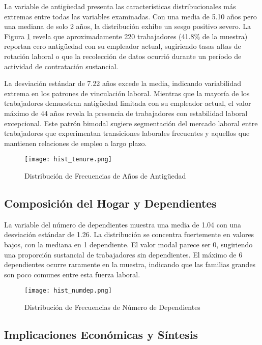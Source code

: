 \documentclass[12pt]{article}
\begin{document}
La variable de antigüedad presenta las características distribucionales más extremas entre todas las variables examinadas. Con una media de 5.10 años pero una mediana de solo 2 años, la distribución exhibe un sesgo positivo severo. La Figura \ref{fig:hist_tenure} revela que aproximadamente 220 trabajadores (41.8\% de la muestra) reportan cero antigüedad con su empleador actual, sugiriendo tasas altas de rotación laboral o que la recolección de datos ocurrió durante un período de actividad de contratación sustancial.

La desviación estándar de 7.22 años excede la media, indicando variabilidad extrema en los patrones de vinculación laboral. Mientras que la mayoría de los trabajadores demuestran antigüedad limitada con su empleador actual, el valor máximo de 44 años revela la presencia de trabajadores con estabilidad laboral excepcional. Este patrón bimodal sugiere segmentación del mercado laboral entre trabajadores que experimentan transiciones laborales frecuentes y aquellos que mantienen relaciones de empleo a largo plazo.

\begin{figure}[H]
\centering
\texttt{[image: hist\_tenure.png]}
\caption{Distribución de Frecuencias de Años de Antigüedad}
\label{fig:hist_tenure}
\end{figure}

\subsection{Composición del Hogar y Dependientes}

La variable del número de dependientes muestra una media de 1.04 con una desviación estándar de 1.26. La distribución se concentra fuertemente en valores bajos, con la mediana en 1 dependiente. El valor modal parece ser 0, sugiriendo una proporción sustancial de trabajadores sin dependientes. El máximo de 6 dependientes ocurre raramente en la muestra, indicando que las familias grandes son poco comunes entre esta fuerza laboral.

\begin{figure}[H]
\centering
\texttt{[image: hist\_numdep.png]}
\caption{Distribución de Frecuencias de Número de Dependientes}
\label{fig:hist_numdep}
\end{figure}

\subsection{Implicaciones Económicas y Síntesis}
\end{document}
